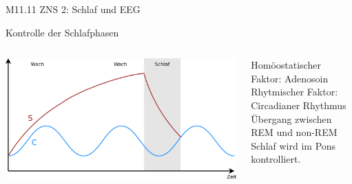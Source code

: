 \documentclass{beamer}
\begin{document}
\begin{frame}{M11.11 ZNS 2: Schlaf und EEG}
\begin{block}{Kontrolle der Schlafphasen}
\begin{columns}[c]
\begin{column}{3cm}
    \begin{center}
        \includegraphics[width=\textwidth]{Zwei-prozess-2.png}
    \end{center}
    
    \end{column}
    
    \begin{column}{8cm}
    Homöostatischer Faktor: Adenosoin  \\
    Rhytmischer Faktor: Circadianer Rhythmus \\
    Übergang zwischen REM und non-REM Schlaf wird im Pons kontrolliert. 


    
    \end{column}
    
    \end{columns}
    



    
    
    \end{block}
    
\end{frame}
\end{document}

